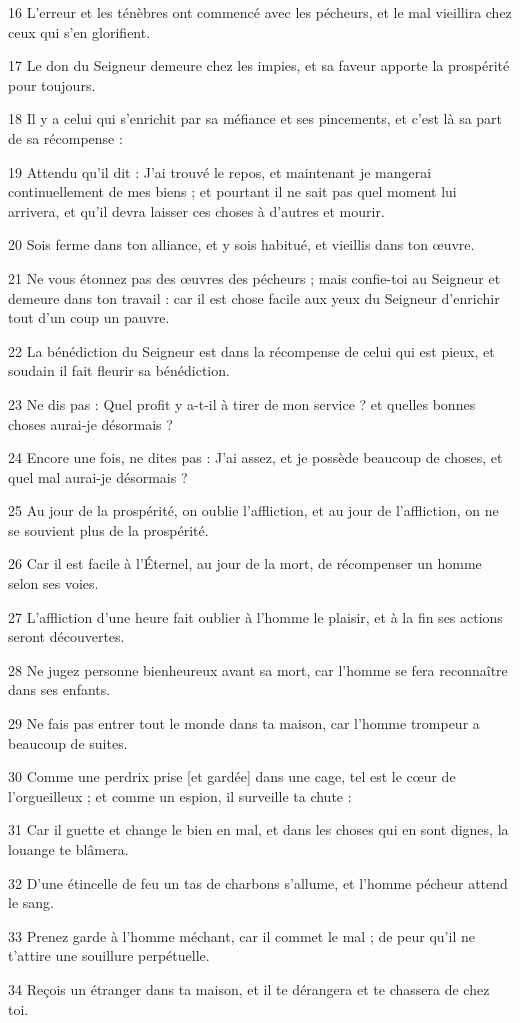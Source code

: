 \par 16 L'erreur et les ténèbres ont commencé avec les pécheurs, et le mal vieillira chez ceux qui s'en glorifient.
\par 17 Le don du Seigneur demeure chez les impies, et sa faveur apporte la prospérité pour toujours.
\par 18 Il y a celui qui s'enrichit par sa méfiance et ses pincements, et c'est là sa part de sa récompense :
\par 19 Attendu qu'il dit : J'ai trouvé le repos, et maintenant je mangerai continuellement de mes biens ; et pourtant il ne sait pas quel moment lui arrivera, et qu'il devra laisser ces choses à d'autres et mourir.
\par 20 Sois ferme dans ton alliance, et y sois habitué, et vieillis dans ton œuvre.
\par 21 Ne vous étonnez pas des œuvres des pécheurs ; mais confie-toi au Seigneur et demeure dans ton travail : car il est chose facile aux yeux du Seigneur d'enrichir tout d'un coup un pauvre.
\par 22 La bénédiction du Seigneur est dans la récompense de celui qui est pieux, et soudain il fait fleurir sa bénédiction.
\par 23 Ne dis pas : Quel profit y a-t-il à tirer de mon service ? et quelles bonnes choses aurai-je désormais ?
\par 24 Encore une fois, ne dites pas : J'ai assez, et je possède beaucoup de choses, et quel mal aurai-je désormais ?
\par 25 Au jour de la prospérité, on oublie l'affliction, et au jour de l'affliction, on ne se souvient plus de la prospérité.
\par 26 Car il est facile à l'Éternel, au jour de la mort, de récompenser un homme selon ses voies.
\par 27 L'affliction d'une heure fait oublier à l'homme le plaisir, et à la fin ses actions seront découvertes.
\par 28 Ne jugez personne bienheureux avant sa mort, car l'homme se fera reconnaître dans ses enfants.
\par 29 Ne fais pas entrer tout le monde dans ta maison, car l'homme trompeur a beaucoup de suites.
\par 30 Comme une perdrix prise [et gardée] dans une cage, tel est le cœur de l'orgueilleux ; et comme un espion, il surveille ta chute :
\par 31 Car il guette et change le bien en mal, et dans les choses qui en sont dignes, la louange te blâmera.
\par 32 D'une étincelle de feu un tas de charbons s'allume, et l'homme pécheur attend le sang.
\par 33 Prenez garde à l'homme méchant, car il commet le mal ; de peur qu'il ne t'attire une souillure perpétuelle.
\par 34 Reçois un étranger dans ta maison, et il te dérangera et te chassera de chez toi.

